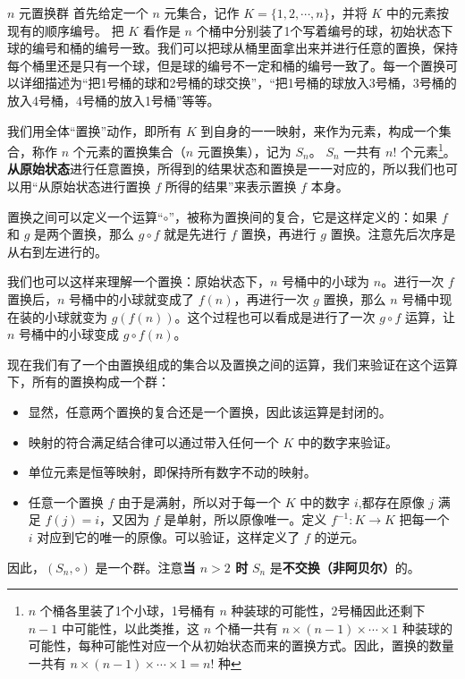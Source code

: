 \begin{example}{$n$ 元置换群}\label{ex_Group_3}
首先给定一个 $n$ 元集合，记作 $K=\{1,2, \cdots, n\}$，并将 $K$ 中的元素按现有的顺序编号。 把 $K$ 看作是 $n$ 个桶中分别装了1个写着编号的球，初始状态下球的编号和桶的编号一致。我们可以把球从桶里面拿出来并进行任意的置换，保持每个桶里还是只有一个球，但是球的编号不一定和桶的编号一致了。每一个置换可以详细描述为“把1号桶的球和2号桶的球交换”，“把1号桶的球放入3号桶，3号桶的放入4号桶，4号桶的放入1号桶”等等。

我们用全体“置换”动作，即所有 $K$ 到自身的一一映射，来作为元素，构成一个集合，称作 $n$ 个元素的置换集合（$n$ 元置换集），记为 $S_n$。 $S_n$ 一共有 $n!$ 个元素\footnote{$n$ 个桶各里装了1个小球，1号桶有 $n$ 种装球的可能性，2号桶因此还剩下 $n-1$ 中可能性，以此类推，这 $n$ 个桶一共有 $n\times(n-1)\times\cdots\times1$ 种装球的可能性，每种可能性对应一个从初始状态而来的置换方式。因此，置换的数量一共有 $n\times(n-1)\times\cdots\times1=n!$ 种}。 \textbf{从原始状态}进行任意置换，所得到的结果状态和置换是一一对应的，所以我们也可以用“从原始状态进行置换 $f$ 所得的结果”来表示置换 $f$ 本身。

置换之间可以定义一个运算“$\circ$”，被称为置换间的复合，它是这样定义的：如果 $f$ 和 $g$ 是两个置换，那么 $g\circ f$ 就是先进行 $f$ 置换，再进行 $g$ 置换。注意先后次序是从右到左进行的。

我们也可以这样来理解一个置换：原始状态下，$n$ 号桶中的小球为 $n$。进行一次 $f$ 置换后，$n$ 号桶中的小球就变成了 $f(n)$，再进行一次 $g$ 置换，那么 $n$ 号桶中现在装的小球就变为 $g(f(n))$。这个过程也可以看成是进行了一次 $g\circ f$ 运算，让 $n$ 号桶中的小球变成 $g\circ f(n)$。

现在我们有了一个由置换组成的集合以及置换之间的运算，我们来验证在这个运算下，所有的置换构成一个群：
\begin{itemize}
\item 显然，任意两个置换的复合还是一个置换，因此该运算是封闭的。
\item 映射的符合满足结合律可以通过带入任何一个 $K$ 中的数字来验证。
\item 单位元素是恒等映射，即保持所有数字不动的映射。
\item 任意一个置换 $f$ 由于是满射，所以对于每一个 $K$ 中的数字 $i$,都存在原像 $j$ 满足 $f(j)=i$，又因为 $f$ 是单射，所以原像唯一。定义 $f^{-1}:K\rightarrow K$ 把每一个 $i$ 对应到它的唯一的原像。可以验证，这样定义了 $f$ 的逆元。
\end{itemize}

因此，$(S_n, \circ)$ 是一个群。注意\textbf{当 $n>2$ 时} $S_n$ 是\textbf{不交换（非阿贝尔）}的。
\end{example}

